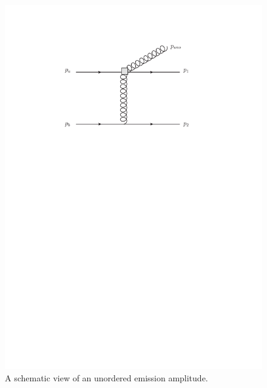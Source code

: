 \begin{figure}[t]
\centering
\includegraphics[scale=0.7]{Images/uno.pdf}
\caption{A schematic view of an unordered emission amplitude.}
\label{fig:uno}
\end{figure}

